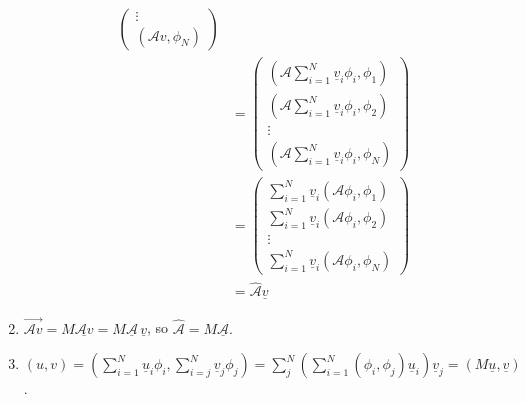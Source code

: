 \documentclass{article}
\begin{document}
\begin{enumerate}[1.]
\begin{equation*}
\begin{aligned}
\begin{pmatrix}
                                                       \vdots                \\
                                                       (\mathcal{A}v,\phi_N)
                                                   \end{pmatrix}                                  \\
                                                & =\begin{pmatrix}
                                                       (\mathcal{A}\sum_{i=1}^N \underline{v}_i\phi_i,\phi_1) \\
                                                       (\mathcal{A}\sum_{i=1}^N \underline{v}_i\phi_i,\phi_2) \\
                                                       \vdots                                                 \\
                                                       (\mathcal{A}\sum_{i=1}^N \underline{v}_i\phi_i,\phi_N)
                                                   \end{pmatrix} \\
                                                & =\begin{pmatrix}
                                                       \sum_{i=1}^N \underline{v}_i(\mathcal{A}\phi_i,\phi_1) \\
                                                       \sum_{i=1}^N \underline{v}_i(\mathcal{A}\phi_i,\phi_2) \\
                                                       \vdots                                                 \\
                                                       \sum_{i=1}^N \underline{v}_i(\mathcal{A}\phi_i,\phi_N)
                                                   \end{pmatrix} \\
                                                & =\hat{\mathcal{A}}\underline{v}
              \end{aligned}
          \end{equation*}
    \item $\overrightarrow{\mathcal{A}v} =M\underline{\mathcal{A}v}=M\underline{\mathcal{A}}\,\underline{v}$, so $\hat{\mathcal{A}}=M\underline{\mathcal{A}}.$
    \item $(u,v)=(\sum_{i=1}^N\underline{u}_i\phi_i,\sum_{i=j}^N\underline{v}_j\phi_j)=\sum_{j}^N(\sum_{i=1}^{N}(\phi_i,\phi_j)\underline{u}_i)\underline{v}_j=(M\underline{u},\underline{v})$.
\end{enumerate}
\end{document}

